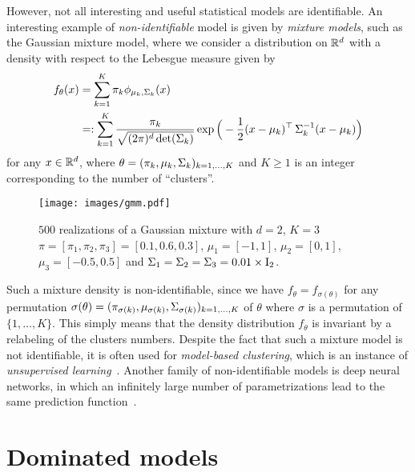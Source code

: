 However, not all interesting and useful statistical models are identifiable. 
An interesting example of \emph{non-identifiable} model is given by \emph{mixture models}, such as the Gaussian mixture model, where we consider a distribution on $\mathbb R^d$ with a density with respect to the Lebesgue measure given by 
%
\begin{align*}
	f_\theta(x) &= \sum_{k=1}^K \pi_k \phi_{\mu_k, \operatorname{\boldsymbol \Sigma}_k}(x) \\ 
	&=: \sum_{k=1}^K \frac{\pi_k }{\sqrt{(2 \pi)^d \det (\operatorname{\boldsymbol \Sigma}_k)}} 
	\exp\Big( -\frac 12 (x - \mu_k)^\top \operatorname{\boldsymbol \Sigma}_k^{-1} (x - \mu_k) \Big)
\end{align*}
for any $x \in \mathbb R^d$, where $\theta = (\pi_k, \mu_k, \operatorname{\boldsymbol \Sigma}_k)_{k=1, \ldots, K}$ and $K \geq 1$ is an integer corresponding to the number of ``clusters''.
\begin{figure}[htbp]
	\texttt{[image: images/gmm.pdf]}
	\caption{$500$ realizations of a Gaussian mixture with $d=2$, $K=3$ $\pi = [\pi_1, \pi_2, \pi_3] = [0.1, 0.6, 0.3]$, $\mu_1 = [-1, 1]$, $\mu_2 = [0, 1]$, $\mu_3 = [-0.5, 0.5]$ and $\operatorname{\boldsymbol \Sigma}_1 = \operatorname{\boldsymbol \Sigma}_2 = \operatorname{\boldsymbol \Sigma}_3 = 0.01 \times \operatorname{{\boldsymbol I}}_2$.}
\end{figure}
Such a mixture density is non-identifiable, since we have $f_{\theta} = f_{\sigma(\theta)}$
for any permutation $\sigma(\theta) = (\pi_{\sigma(k)}, \mu_{\sigma(k)}, \operatorname{\boldsymbol \Sigma}_{\sigma(k)})_{k=1, \ldots, K}$ of $\theta$ where $\sigma$ is a permutation of $\{1, \ldots, K \}$.
This simply means that the density distribution $f_\theta$ is invariant by a relabeling of the clusters numbers.
Despite the fact that such a mixture model is not identifiable, it is often used for \emph{model-based clustering}, which is an instance of \emph{unsupervised learning}~.
Another family of non-identifiable models is deep neural networks, in which an infinitely large number of parametrizations lead to the same prediction function~.

\section{Dominated models} 

